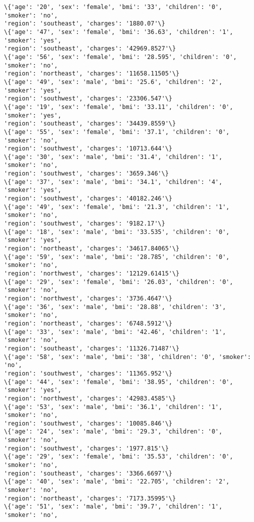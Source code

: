 \documentclass[11pt]{article}
\begin{document}
\begin{Verbatim}[commandchars=\\\{\}]
\{'age': '20', 'sex': 'female', 'bmi': '33', 'children': '0', 'smoker': 'no',
'region': 'southeast', 'charges': '1880.07'\}
\{'age': '47', 'sex': 'female', 'bmi': '36.63', 'children': '1', 'smoker': 'yes',
'region': 'southeast', 'charges': '42969.8527'\}
\{'age': '56', 'sex': 'female', 'bmi': '28.595', 'children': '0', 'smoker': 'no',
'region': 'northeast', 'charges': '11658.11505'\}
\{'age': '49', 'sex': 'male', 'bmi': '25.6', 'children': '2', 'smoker': 'yes',
'region': 'southwest', 'charges': '23306.547'\}
\{'age': '19', 'sex': 'female', 'bmi': '33.11', 'children': '0', 'smoker': 'yes',
'region': 'southeast', 'charges': '34439.8559'\}
\{'age': '55', 'sex': 'female', 'bmi': '37.1', 'children': '0', 'smoker': 'no',
'region': 'southwest', 'charges': '10713.644'\}
\{'age': '30', 'sex': 'male', 'bmi': '31.4', 'children': '1', 'smoker': 'no',
'region': 'southwest', 'charges': '3659.346'\}
\{'age': '37', 'sex': 'male', 'bmi': '34.1', 'children': '4', 'smoker': 'yes',
'region': 'southwest', 'charges': '40182.246'\}
\{'age': '49', 'sex': 'female', 'bmi': '21.3', 'children': '1', 'smoker': 'no',
'region': 'southwest', 'charges': '9182.17'\}
\{'age': '18', 'sex': 'male', 'bmi': '33.535', 'children': '0', 'smoker': 'yes',
'region': 'northeast', 'charges': '34617.84065'\}
\{'age': '59', 'sex': 'male', 'bmi': '28.785', 'children': '0', 'smoker': 'no',
'region': 'northwest', 'charges': '12129.61415'\}
\{'age': '29', 'sex': 'female', 'bmi': '26.03', 'children': '0', 'smoker': 'no',
'region': 'northwest', 'charges': '3736.4647'\}
\{'age': '36', 'sex': 'male', 'bmi': '28.88', 'children': '3', 'smoker': 'no',
'region': 'northeast', 'charges': '6748.5912'\}
\{'age': '33', 'sex': 'male', 'bmi': '42.46', 'children': '1', 'smoker': 'no',
'region': 'southeast', 'charges': '11326.71487'\}
\{'age': '58', 'sex': 'male', 'bmi': '38', 'children': '0', 'smoker': 'no',
'region': 'southwest', 'charges': '11365.952'\}
\{'age': '44', 'sex': 'female', 'bmi': '38.95', 'children': '0', 'smoker': 'yes',
'region': 'northwest', 'charges': '42983.4585'\}
\{'age': '53', 'sex': 'male', 'bmi': '36.1', 'children': '1', 'smoker': 'no',
'region': 'southwest', 'charges': '10085.846'\}
\{'age': '24', 'sex': 'male', 'bmi': '29.3', 'children': '0', 'smoker': 'no',
'region': 'southwest', 'charges': '1977.815'\}
\{'age': '29', 'sex': 'female', 'bmi': '35.53', 'children': '0', 'smoker': 'no',
'region': 'southeast', 'charges': '3366.6697'\}
\{'age': '40', 'sex': 'male', 'bmi': '22.705', 'children': '2', 'smoker': 'no',
'region': 'northeast', 'charges': '7173.35995'\}
\{'age': '51', 'sex': 'male', 'bmi': '39.7', 'children': '1', 'smoker': 'no',

\end{Verbatim}
\end{document}
